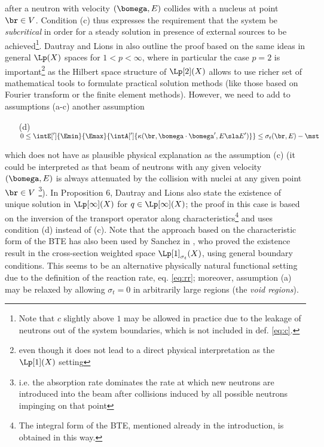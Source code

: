 after a neutron with velocity $(\bomega, E)$ collides with a nucleus at point $\br\in V$. Condition (c) thus expresses 
the requirement that the system be \textit{subcritical} in order for a steady solution in presence of external sources 
to be achieved\footnote{Note that $c$ slightly above $1$ may be allowed in practice due to the leakage of neutrons out 
of the system boundaries, which is not included in def. \eqref{eq:c}.}. Dautray and Lions in 
\cite[\S2, Chap. XXI]{DautrayLions} also outline the proof based on the same ideas in general $\Lp(X)$ spaces for 
$1 < p < \infty$, where in particular the case $p = 2$ is important\footnote{even though it does not lead to a direct 
physical interpretation as the $\Lp[1](X)$ setting} as the Hilbert space structure of $\Lp[2](X)$ allows to use richer 
set of mathematical tools to formulate practical solution methods (like those based on Fourier transform or the finite 
element methods). However, we need to add to assumptions (a-c) another assumption
\begin{enumerate}
  \item[(d)] ~~~~~~~~~~~~$\displaystyle 0 \leq \intE[']{\Emin}{\Emax}{\intA[']{\kappa(\br,\bomega\cdot\bomega',E\sla E')}} \leq \sigma_t(\br,E) - \mst$
\end{enumerate}
which does not have as plausible physical explanation as the assumption (c) (it could be interpreted as that beam of 
neutrons with any given velocity $(\bomega, E)$ is always attenuated by the collision with nuclei at any given point 
$\br\in V$ \footnote{i.e. the absorption rate dominates the rate at which new neutrons are introduced into the beam 
after collisions induced by all possible neutrons impinging on that point}). In Proposition 6, Dautray and Lions also 
state the existence of unique solution in $\Lp[\infty](X)$ for $q\in \Lp[\infty](X)$; the proof in this case is based on
 the inversion of the transport operator along characteristics\footnote{The integral form of the BTE, mentioned already 
 in the introduction, is obtained in this way.} and uses condition (d) instead of (c). Note that the approach based on 
 the characteristic form of the BTE has also been used by Sanchez in \cite{Sanchez3}, who proved the existence result in
  the cross-section weighted space $\Lp[1]_{\sigma_t}(X)$, using general boundary conditions. This seems to be an 
  alternative physically natural functional setting due to the definition of the reaction rate, eq. \eqref{eq:rr}; 
  moreover, assumption (a) may be relaxed by allowing $\sigma_t = 0$ in arbitrarily large regions 
  (the \textit{void regions}).

